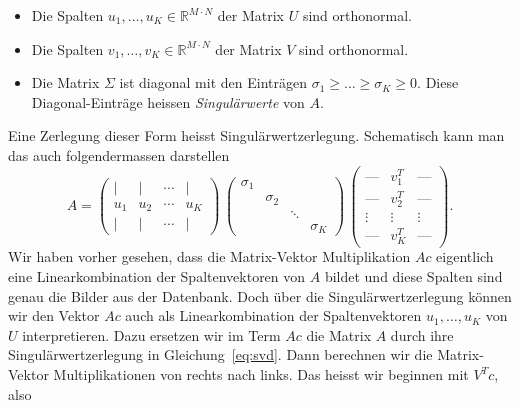 \begin{itemize}
	\item Die Spalten $u_1,\ldots,u_K\in\mathbb R^{M\cdot N}$ der Matrix $U$ sind orthonormal.
	\item Die Spalten $v_1,\ldots,v_K\in\mathbb R^{M\cdot N}$ der Matrix $V$ sind orthonormal.
	\item Die Matrix $\Sigma$ ist diagonal mit den Einträgen $\sigma_1\geq\ldots\geq\sigma_K\geq 0$.
	Diese Diagonal-Einträge heissen \textit{Singulärwerte} von $A$.
\end{itemize}
Eine Zerlegung dieser Form heisst Singulärwertzerlegung.
Schematisch kann man das auch folgendermassen darstellen
\begin{equation}\label{eq:svd}
A=
\begin{pmatrix}
	\vert & \vert & \cdots & \vert \\
	u_1   & u_2   & \cdots & u_K \\
	\vert & \vert & \cdots & \vert
\end{pmatrix}
\,
\begin{pmatrix}
	\sigma_1 & & & \\
	& \sigma_2 & & \\
	& & \ddots & \\
	& & & \sigma_K
\end{pmatrix}
\,
\begin{pmatrix}
	\text{---} & v_1^T & \text{---} \\
	\text{---} & v_2^T & \text{---} \\
	\vdots & \vdots & \vdots \\
	\text{---} & v_K^T & \text{---}
\end{pmatrix}.
\end{equation}
Wir haben vorher gesehen, dass die Matrix-Vektor Multiplikation $Ac$ eigentlich eine Linearkombination der Spaltenvektoren von $A$ bildet und diese Spalten sind genau die Bilder aus der Datenbank.
Doch über die Singulärwertzerlegung können wir den Vektor $Ac$ auch als Linearkombination der Spaltenvektoren $u_1,\ldots,u_K$ von $U$ interpretieren.
Dazu ersetzen wir im Term $Ac$ die Matrix $A$ durch ihre Singulärwertzerlegung in Gleichung~\ref{eq:svd}.
Dann berechnen wir die Matrix-Vektor Multiplikationen von rechts nach links.
Das heisst wir beginnen mit $V^Tc$, also
